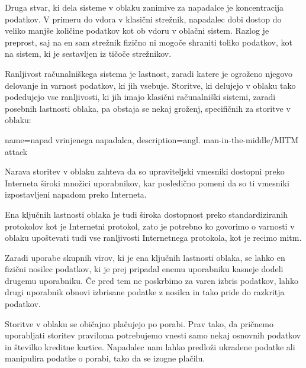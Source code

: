 \documentclass[12pt,a4paper,openany]{book}
\begin{document}
Druga stvar, ki dela sisteme v oblaku zanimive za napadalce je koncentracija podatkov. V primeru do vdora v klasični strežnik, napadalec dobi dostop do veliko manjše količine podatkov kot ob vdoru v oblačni sistem. Razlog je preprost, saj na en sam strežnik fizično ni mogoče shraniti toliko podatkov, kot na sistem, ki je sestavljen iz tičoče strežnikov.

Ranljivost računalniškega sistema je lastnost, zaradi katere je ogroženo njegovo delovanje in varnost podatkov, ki jih vsebuje. Storitve, ki delujejo v oblaku tako podedujejo vse ranljivosti, ki jih imajo klasični računalniški sistemi, zaradi posebnih lastnosti oblaka, pa obstaja se nekaj groženj, specifičnih za storitve v oblaku:

{
  name={napad vrinjenega napadalca},
  description={angl. man-in-the-middle/MITM attack}
}

\begin{description}[style=nextline]

\item[Nedovoljen dostop do upraviteljskega in programskega vmesnika] Narava storitev v oblaku zahteva da so upraviteljski vmesniki dostopni preko Interneta široki množici uporabnikov, kar posledično pomeni da so ti vmesniki izpostavljeni napadom preko Interneta.

\item[Ranljivosti internetnega protokola] Ena ključnih lastnosti oblaka je tudi široka dostopnost preko standardiziranih protokolov kot je Internetni protokol, zato je potrebno ko govorimo o varnosti v oblaku upoštevati tudi vse ranljivosti Internetnega protokola, kot je recimo \gls{mitm}.

\item[Ranljivosti obnovitve podatkov] Zaradi uporabe skupnih virov, ki je ena ključnih lastnosti oblaka, se lahko en fizični nosilec podatkov, ki je prej pripadal enemu uporabniku kasneje dodeli drugemu uporabniku. Če pred tem ne poskrbimo za varen izbris podatkov, lahko drugi uporabnik obnovi izbrisane podatke z nosilca in tako pride do razkritja podatkov.

\item[Izogibanje merjenju in plačilu] Storitve v oblaku se običajno plačujejo po porabi. Prav tako, da pričnemo uporabljati storitev praviloma potrebujemo vnesti samo nekaj osnovnih podatkov in številko kreditne kartice. Napadalec nam lahko predloži ukradene podatke ali manipulira podatke o porabi, tako da se izogne plačilu.

\end{description}
\end{document}
